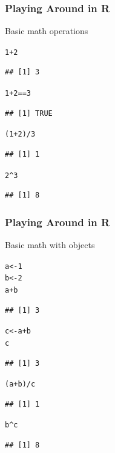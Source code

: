 \documentclass{beamer}\usepackage[]{graphicx}\usepackage[]{color}
\makeatletter
\newcommand{\hlnum}[1]{\textcolor[rgb]{0.686,0.059,0.569}{#1}}%
\newcommand{\hlopt}[1]{\textcolor[rgb]{0,0,0}{#1}}%
\newcommand{\hlstd}[1]{\textcolor[rgb]{0.345,0.345,0.345}{#1}}%
\newcommand{\hlkwb}[1]{\textcolor[rgb]{0.69,0.353,0.396}{#1}}%
\newenvironment{kframe}{%
 \def\at@end@of@kframe{}%
 \ifinner\ifhmode%
  \def\at@end@of@kframe{\end{minipage}}%
  \begin{minipage}{\columnwidth}%
 \fi\fi%
 \def\FrameCommand##1{\hskip\@totalleftmargin \hskip-\fboxsep
 \colorbox{shadecolor}{##1}\hskip-\fboxsep
     \hskip-\linewidth \hskip-\@totalleftmargin \hskip\columnwidth}%
 \MakeFramed {\advance\hsize-\width
   \@totalleftmargin\z@ \linewidth\hsize
   \@setminipage}}%
 {\par\unskip\endMakeFramed%
 \at@end@of@kframe}
\newenvironment{knitrout}{}{} %
\makeatother
\begin{document}
\begin{frame}[fragile]\frametitle{Playing Around in R}
    Basic math operations
\begin{knitrout}\footnotesize
{}\color{fgcolor}\begin{kframe}
\begin{alltt}
\hlnum{1} \hlopt{+} \hlnum{2}
\end{alltt}
\begin{verbatim}
## [1] 3
\end{verbatim}
\begin{alltt}
\hlnum{1} \hlopt{+} \hlnum{2} \hlopt{==} \hlnum{3}
\end{alltt}
\begin{verbatim}
## [1] TRUE
\end{verbatim}
\begin{alltt}
\hlstd{(}\hlnum{1} \hlopt{+} \hlnum{2}\hlstd{)} \hlopt{/} \hlnum{3}
\end{alltt}
\begin{verbatim}
## [1] 1
\end{verbatim}
\begin{alltt}
\hlnum{2}\hlopt{^}\hlnum{3}
\end{alltt}
\begin{verbatim}
## [1] 8
\end{verbatim}
\end{kframe}
\end{knitrout}
\end{frame}

\begin{frame}[fragile]\frametitle{Playing Around in R}
    Basic math with objects
\begin{knitrout}\footnotesize
{}\color{fgcolor}\begin{kframe}
\begin{alltt}
\hlstd{a} \hlkwb{<-} \hlnum{1}
\hlstd{b} \hlkwb{<-} \hlnum{2}
\hlstd{a} \hlopt{+} \hlstd{b}
\end{alltt}
\begin{verbatim}
## [1] 3
\end{verbatim}
\begin{alltt}
\hlstd{c} \hlkwb{<-} \hlstd{a} \hlopt{+} \hlstd{b}
\hlstd{c}
\end{alltt}
\begin{verbatim}
## [1] 3
\end{verbatim}
\begin{alltt}
\hlstd{(a} \hlopt{+} \hlstd{b)} \hlopt{/} \hlstd{c}
\end{alltt}
\begin{verbatim}
## [1] 1
\end{verbatim}
\begin{alltt}
\hlstd{b}\hlopt{^}\hlstd{c}
\end{alltt}
\begin{verbatim}
## [1] 8
\end{verbatim}
\end{kframe}
\end{knitrout}
\end{frame}
\end{document}
